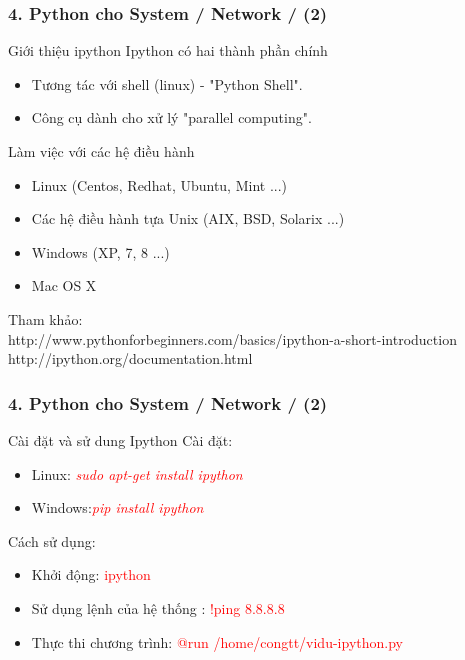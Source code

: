 \documentclass[10pt]{beamer}
\begin{document}
\label{Slide 4:Python cho Sysad - ipython}
\begin{frame}[fragile] \label{Gioi thieu ipython}
\label{Slide xxx: Gioi thieu ve ipython }
\frametitle{4. Python cho System / Network / (2) }
\begin{block}{Giới thiệu ipython}
Ipython có hai thành phần chính
\begin{itemize}
\item Tương tác với shell (linux) - "Python Shell".
\item Công cụ dành cho xử lý "parallel computing".
\end{itemize}
Làm việc với các hệ điều hành
\begin{itemize}
\item Linux (Centos, Redhat, Ubuntu, Mint ...)
\item Các hệ điều hành tựa Unix (AIX, BSD, Solarix ...)
\item Windows (XP, 7, 8 ...)
\item Mac OS X
\end{itemize}
\end{block}
Tham khảo:\\
http://www.pythonforbeginners.com/basics/ipython-a-short-introduction\\
http://ipython.org/documentation.html
\end{frame}
\label{Slide xxx: cai dat va su dung ipython}
\begin{frame}[fragile]
\frametitle{4. Python cho System / Network / (2)}
\begin{block}{Cài đặt và sử dung Ipython}
Cài đặt:
\pause
\begin{itemize}
\item Linux: \textit{\textcolor{red}{sudo apt-get install ipython}}
\pause
\item Windows:\textit{\textcolor{red}{pip install ipython}}
\end{itemize}
\pause
Cách sử dụng:
\pause
\begin{itemize}
\item Khởi động: \textcolor{red}{ipython}\pause
\item Sử dụng lệnh của hệ thống : \textcolor{red}{!ping 8.8.8.8}\pause
\item Thực thi chương trình: \textcolor{red}{@run /home/congtt/vidu-ipython.py}
\end{itemize}
\end{block}
\end{frame}
\end{document}
